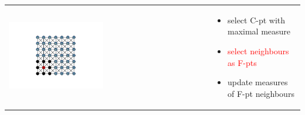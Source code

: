 \documentclass[12pt]{beamer}
\newcommand{\re}[1]{{\textcolor{red}       {#1}}}
\begin{document}
\begin{frame}


\begin{tabular}{ p{} p{}}

\hspace{5mm} \includegraphics[trim = 85mm 40mm 85mm  40mm, clip, width=0.48\textwidth]{AMG3.png} &

\vspace{-1.75in}

\begin{itemize}
  \item select C-pt with maximal measure
  \item \re{select neighbours as F-pts}
  \item update measures of F-pt neighbours

\end{itemize}
\end{tabular}


\end{frame}
\end{document}
